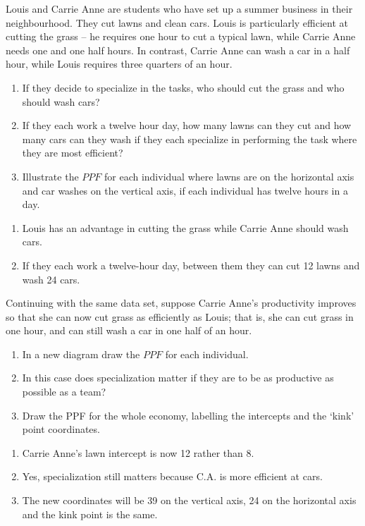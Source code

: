 \begin{enumialphparenastyle}
\begin{econex}\label{ex:ch1ex5}
Louis and Carrie Anne are students who have set up a summer business in their neighbourhood. They cut lawns and clean cars. Louis is particularly efficient at cutting the grass -- he requires one hour to cut a typical lawn, while Carrie Anne needs one and one half hours. In contrast, Carrie Anne can wash a car in a half hour, while Louis requires three quarters of an hour.
\begin{enumerate}
	\item If they decide to specialize in the tasks, who should cut the grass and who should wash cars?
	\item If they each work a twelve hour day, how many lawns can they cut and how many cars can they wash if they each specialize in performing the task where they are most efficient?
	\item Illustrate the $PPF$ for each individual where lawns are on the horizontal axis and car washes on the vertical axis, if each individual has twelve hours in a day.
\end{enumerate}
\begin{econsolution}
\begin{enumerate}
	\item	Louis has an advantage in cutting the grass while Carrie Anne should wash cars.
	\item	If they each work a twelve-hour day, between them they can cut 12 lawns and wash 24 cars.
\end{enumerate}
\end{econsolution}
\end{econex}

\begin{econex}\label{ex:ch1ex6}
Continuing with the same data set, suppose Carrie Anne's productivity improves so that she can now cut grass as efficiently as Louis; that is, she can cut grass in one hour, and can still wash a car in one half of an hour.
\begin{enumerate}
	\item	In a new diagram draw the $PPF$ for each individual.
	\item	In this case does specialization matter if they are to be as productive as possible as a team?
	\item	Draw the PPF for the whole economy, labelling the intercepts and the `kink' point coordinates.
\end{enumerate}
\begin{econsolution}
\begin{enumerate}
	\item	Carrie Anne's lawn intercept is now 12 rather than 8.
	\item	Yes, specialization still matters because C.A. is more efficient at cars.
	\item	The new coordinates will be 39 on the vertical axis, 24 on the horizontal axis and the kink point is the same.
\end{enumerate}
\end{econsolution}
\end{econex}


\end{enumialphparenastyle}
